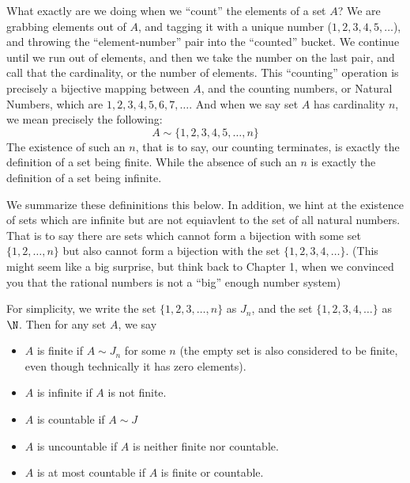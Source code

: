\documentclass[../../templates/section]{subfiles}
\begin{document}
What exactly are we doing when we ``count'' the elements of a set $A$? We are
grabbing elements out of $A$, and tagging it with a unique number ($1, 2, 3, 4,
5, \ldots$), and throwing the ``element-number'' pair into the ``counted''
bucket. We continue until we run out of elements, and then we take the number
on the last pair, and call that the cardinality, or the number of elements.
This ``counting'' operation is precisely a bijective mapping between $A$, and
the counting numbers, or Natural Numbers, which are $1, 2, 3, 4, 5, 6, 7,
\ldots$. And when we say set $A$ has cardinality $n$, we mean precisely the
following:
\[
A \sim \{1, 2, 3, 4, 5,\ldots, n\}
\]
The existence of such an $n$, that is to say, our counting terminates, is
exactly the definition of a set being finite.  While the absence of such an $n$
is exactly the definition of a set being infinite. 

We summarize these defininitions this below. In addition, we hint at the
existence of sets which are infinite but are not equiavlent to the set of all
natural numbers. That is to say there are sets which cannot form a bijection
with some set $\{1, 2, \ldots, n\}$ but also cannot form a bijection with the
set $\{1, 2, 3, 4, \ldots\}$.  (This might seem like a big surprise, but think
back to Chapter 1, when we convinced you that the rational numbers is not a
``big'' enough number system)

\begin{definition}
For simplicity, we write the set $\{1, 2, 3,\ldots, n\}$ as $J_n$, and
the set $\{1, 2, 3, 4, \ldots\}$ as $\N$. Then for any set $A$, we say
\begin{itemize}
    \item $A$ is finite if $A \sim J_n$ for some $n$ (the empty set is also
        considered to be finite, even though technically it has zero elements).
    \item $A$ is infinite if $A$ is not finite.
    \item $A$ is countable if $A \sim J$
    \item $A$ is uncountable if $A$ is neither finite nor countable. 
    \item $A$ is at most countable if $A$ is finite or countable.
\end{itemize}
\end{definition}
\end{document}
